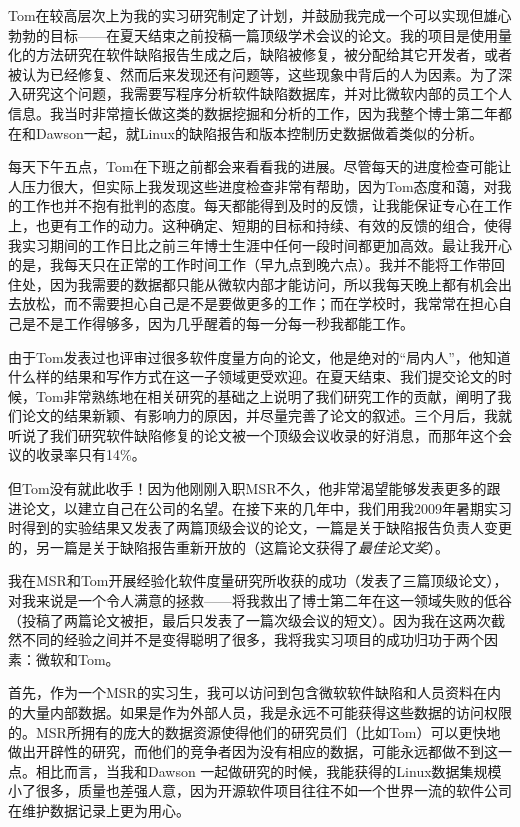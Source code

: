 \documentclass[12pt,UTF8,nofonts]{book}
\begin{document}
\breakline

Tom在较高层次上为我的实习研究制定了计划，并鼓励我完成一个可以实现但雄心勃勃的目标——在夏天结束之前投稿一篇顶级学术会议的论文。我的项目是使用量化的方法研究在软件缺陷报告生成之后，缺陷被修复，被分配给其它开发者，或者被认为已经修复、然而后来发现还有问题等，这些现象中背后的人为因素。为了深入研究这个问题，我需要写程序分析软件缺陷数据库，并对比微软内部的员工个人信息。我当时非常擅长做这类的数据挖掘和分析的工作，因为我整个博士第二年都在和Dawson一起，就Linux的缺陷报告和版本控制历史数据做着类似的分析。

每天下午五点，Tom在下班之前都会来看看我的进展。尽管每天的进度检查可能让人压力很大，但实际上我发现这些进度检查非常有帮助，因为Tom态度和蔼，对我的工作也并不抱有批判的态度。每天都能得到及时的反馈，让我能保证专心在工作上，也更有工作的动力。这种确定、短期的目标和持续、有效的反馈的组合，使得我实习期间的工作日比之前三年博士生涯中任何一段时间都更加高效。最让我开心的是，我每天只在正常的工作时间工作（早九点到晚六点）。我并不能将工作带回住处，因为我需要的数据都只能从微软内部才能访问，所以我每天晚上都有机会出去放松，而不需要担心自己是不是要做更多的工作；而在学校时，我常常在担心自己是不是工作得够多，因为几乎醒着的每一分每一秒我都能工作。

由于Tom发表过也评审过很多软件度量方向的论文，他是绝对的“局内人”，他知道什么样的结果和写作方式在这一子领域更受欢迎。在夏天结束、我们提交论文的时候，Tom非常熟练地在相关研究的基础之上说明了我们研究工作的贡献，阐明了我们论文的结果新颖、有影响力的原因，并尽量完善了论文的叙述。三个月后，我就听说了我们研究软件缺陷修复的论文被一个顶级会议收录的好消息，而那年这个会议的收录率只有14\%。

但Tom没有就此收手！因为他刚刚入职MSR不久，他非常渴望能够发表更多的跟进论文，以建立自己在公司的名望。在接下来的几年中，我们用我2009年暑期实习时得到的实验结果又发表了两篇顶级会议的论文，一篇是关于缺陷报告负责人变更的，另一篇是关于缺陷报告重新开放的（这篇论文获得了\emph{最佳论文奖}）。

\breakline

我在MSR和Tom开展经验化软件度量研究所收获的成功（发表了三篇顶级论文），对我来说是一个令人满意的拯救——将我救出了博士第二年在这一领域失败的低谷（投稿了两篇论文被拒，最后只发表了一篇次级会议的短文）。因为我在这两次截然不同的经验之间并不是变得聪明了很多，我将我实习项目的成功归功于两个因素：微软和Tom。

首先，作为一个MSR的实习生，我可以访问到包含微软软件缺陷和人员资料在内的大量内部数据。如果是作为外部人员，我是永远不可能获得这些数据的访问权限的。MSR所拥有的庞大的数据资源使得他们的研究员们（比如Tom）可以更快地做出开辟性的研究，而他们的竞争者因为没有相应的数据，可能永远都做不到这一点。相比而言，当我和Dawson 一起做研究的时候，我能获得的Linux数据集规模小了很多，质量也差强人意，因为开源软件项目往往不如一个世界一流的软件公司在维护数据记录上更为用心。
\end{document}
